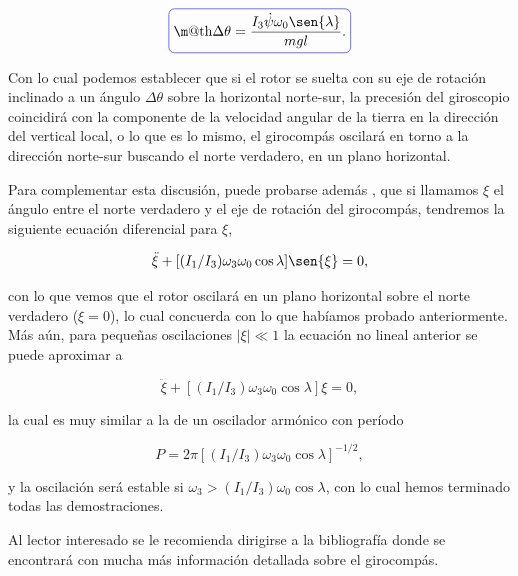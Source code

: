 \documentclass[a4paper,10pt]{article}
\makeatletter
\numberwithin{equation}{section}
\newcommand*{\boxcolor}{blue}
\renewcommand{\boxed}[1]{\textcolor{\boxcolor}{%
\tikz[baseline={([yshift=-1ex]current bounding box.center)}] \node [rectangle, minimum width=1ex,rounded corners,draw] {\normalcolor\m@th$\displaystyle#1$};}}
\makeatother
\begin{document}
\begin{equation}
 \boxed{\Delta\theta = \frac{I_3\dot{\psi}\omega_0\sen{\lambda}}{mgl}.}
\end{equation}

Con lo cual podemos establecer que si el rotor se suelta con su eje de rotación inclinado 
a un ángulo $\Delta\theta$ sobre la horizontal norte-sur, la precesión del giroscopio 
coincidirá con la componente de la velocidad angular de la tierra en la dirección del 
vertical local, o lo que es lo mismo, el girocompás oscilará en torno a la dirección 
norte-sur buscando el norte verdadero, en un plano horizontal.

\vspace{.3cm}

Para complementar esta discusión, puede probarse además \cite{delange}, que si llamamos $\xi$ el ángulo entre el norte 
verdadero y el eje de rotación del girocompás, tendremos la siguiente ecuación diferencial 
para $\xi$,

\begin{equation}
 \ddot{\xi} + [(I_1/I_3)\omega_3\omega_0\cos{\lambda}]\sen{\xi} = 0, 
\end{equation}

con lo que vemos que el rotor oscilará en un plano horizontal sobre el norte verdadero 
($\xi=0$), lo cual concuerda con lo que habíamos probado anteriormente. Más aún, para 
pequeñas oscilaciones $|\xi| \ll 1$ la ecuación no lineal anterior se puede 
aproximar a 

\begin{equation}
 \ddot{\xi} + [(I_1/I_3)\omega_3\omega_0\cos{\lambda}]\xi = 0, 
\end{equation}

la cual es muy similar a la de un oscilador armónico con período 

\begin{equation}
 P = 2\pi[(I_1/I_3)\omega_3\omega_0\cos{\lambda}]^{-1/2},
\end{equation}

y la oscilación será estable \cite{spivak} si $\omega_3 >(I_1/I_3)\omega_0\cos{\lambda}$, 
con lo cual hemos terminado todas las demostraciones.

\vspace{.3cm}

Al lector interesado se le recomienda dirigirse a la bibliografía donde se encontrará 
con mucha más información detallada sobre el girocompás. 

\vspace{.3cm}
\end{document}
